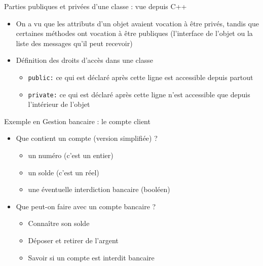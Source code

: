 \begin{frame}{Parties publiques et privées d'une classe : vue depuis C++}
\begin{itemize}
\item On a vu que les attributs d'un objet avaient vocation à être privés, tandis que certaines méthodes ont vocation à être publiques (l'interface de l'objet ou la liste des messages qu'il peut recevoir)
\item Définition des droits d'accès dans une classe
\begin{itemize}
\item \texttt{public:} ce qui est déclaré après cette ligne est accessible depuis partout
\item \texttt{private:} ce qui est déclaré après cette ligne n'est accessible que depuis l'intérieur de l'objet
\end{itemize}
\end{itemize}
\end{frame}
\begin{frame}{Exemple en Gestion bancaire : le compte client}
\begin{itemize}
	\item Que contient un compte (version simplifiée) ?

\begin{itemize}
	\item un numéro (c'est un entier)
	\item un solde (c'est un réel)
	\item une éventuelle interdiction bancaire (booléen)
\end{itemize}

\item Que peut-on faire avec un compte bancaire ?
\begin{itemize}
	\item Connaître son solde
	\item Déposer et retirer de l'argent
	\item Savoir si un compte est interdit bancaire
\end{itemize}

\end{itemize}
\end{frame}


